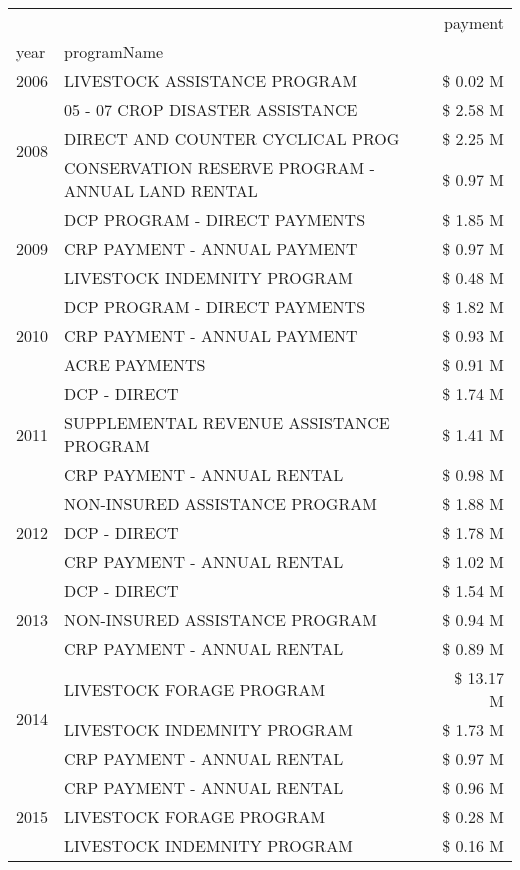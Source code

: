 \begin{tabular}{llr}
\toprule
 &  & payment \\
year & programName &  \\
\midrule
2006 & LIVESTOCK ASSISTANCE PROGRAM & \$ 0.02 M \\
\cline{1-3}
\multirow[t]{3}{*}{2008} & 05 - 07 CROP DISASTER ASSISTANCE & \$ 2.58 M \\
 & DIRECT AND COUNTER CYCLICAL PROG & \$ 2.25 M \\
 & CONSERVATION RESERVE PROGRAM - ANNUAL LAND RENTAL & \$ 0.97 M \\
\cline{1-3}
\multirow[t]{3}{*}{2009} & DCP PROGRAM - DIRECT PAYMENTS & \$ 1.85 M \\
 & CRP PAYMENT - ANNUAL PAYMENT & \$ 0.97 M \\
 & LIVESTOCK INDEMNITY PROGRAM & \$ 0.48 M \\
\cline{1-3}
\multirow[t]{3}{*}{2010} & DCP PROGRAM - DIRECT PAYMENTS & \$ 1.82 M \\
 & CRP PAYMENT - ANNUAL PAYMENT & \$ 0.93 M \\
 & ACRE PAYMENTS & \$ 0.91 M \\
\cline{1-3}
\multirow[t]{3}{*}{2011} & DCP - DIRECT & \$ 1.74 M \\
 & SUPPLEMENTAL REVENUE ASSISTANCE PROGRAM & \$ 1.41 M \\
 & CRP PAYMENT - ANNUAL RENTAL & \$ 0.98 M \\
\cline{1-3}
\multirow[t]{3}{*}{2012} & NON-INSURED ASSISTANCE PROGRAM & \$ 1.88 M \\
 & DCP - DIRECT & \$ 1.78 M \\
 & CRP PAYMENT - ANNUAL RENTAL & \$ 1.02 M \\
\cline{1-3}
\multirow[t]{3}{*}{2013} & DCP - DIRECT & \$ 1.54 M \\
 & NON-INSURED ASSISTANCE PROGRAM & \$ 0.94 M \\
 & CRP PAYMENT - ANNUAL RENTAL & \$ 0.89 M \\
\cline{1-3}
\multirow[t]{3}{*}{2014} & LIVESTOCK FORAGE PROGRAM & \$ 13.17 M \\
 & LIVESTOCK INDEMNITY PROGRAM & \$ 1.73 M \\
 & CRP PAYMENT - ANNUAL RENTAL & \$ 0.97 M \\
\cline{1-3}
\multirow[t]{3}{*}{2015} & CRP PAYMENT - ANNUAL RENTAL & \$ 0.96 M \\
 & LIVESTOCK FORAGE PROGRAM & \$ 0.28 M \\
 & LIVESTOCK INDEMNITY PROGRAM & \$ 0.16 M \\

\end{tabular}
